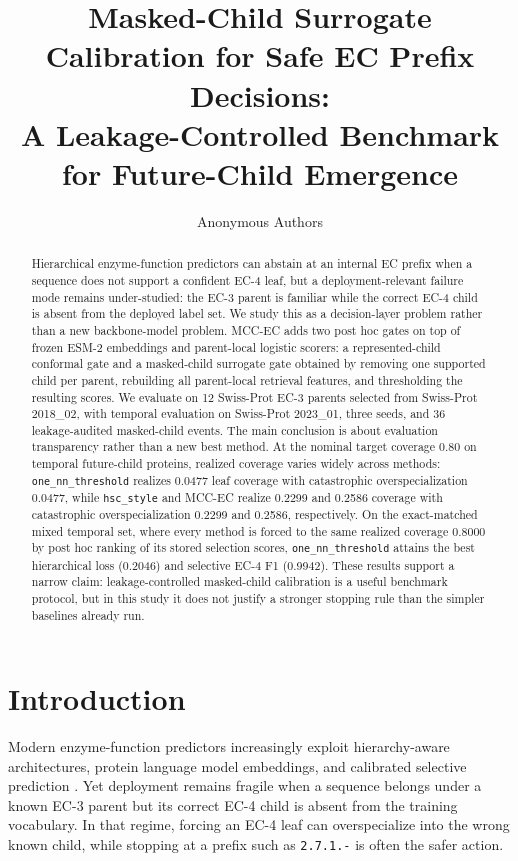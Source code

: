 \documentclass{article}
\title{Masked-Child Surrogate Calibration for Safe EC Prefix Decisions:\\A Leakage-Controlled Benchmark for Future-Child Emergence}
\author{Anonymous Authors}
\newcommand{\method}{MCC-EC\xspace}
\begin{document}
\maketitle

\begin{abstract}
Hierarchical enzyme-function predictors can abstain at an internal EC prefix when a sequence does not support a confident EC-4 leaf, but a deployment-relevant failure mode remains under-studied: the EC-3 parent is familiar while the correct EC-4 child is absent from the deployed label set. We study this as a decision-layer problem rather than a new backbone-model problem. \method adds two post hoc gates on top of frozen ESM-2 embeddings and parent-local logistic scorers: a represented-child conformal gate and a masked-child surrogate gate obtained by removing one supported child per parent, rebuilding all parent-local retrieval features, and thresholding the resulting scores. We evaluate on 12 Swiss-Prot EC-3 parents selected from Swiss-Prot 2018\_02, with temporal evaluation on Swiss-Prot 2023\_01, three seeds, and 36 leakage-audited masked-child events. The main conclusion is about evaluation transparency rather than a new best method. At the nominal target coverage 0.80 on temporal future-child proteins, realized coverage varies widely across methods: \texttt{one\_nn\_threshold} realizes 0.0477 leaf coverage with catastrophic overspecialization 0.0477, while \texttt{hsc\_style} and \method realize 0.2299 and 0.2586 coverage with catastrophic overspecialization 0.2299 and 0.2586, respectively. On the exact-matched mixed temporal set, where every method is forced to the same realized coverage 0.8000 by post hoc ranking of its stored selection scores, \texttt{one\_nn\_threshold} attains the best hierarchical loss (0.2046) and selective EC-4 F1 (0.9942). These results support a narrow claim: leakage-controlled masked-child calibration is a useful benchmark protocol, but in this study it does not justify a stronger stopping rule than the simpler baselines already run.
\end{abstract}

\section{Introduction}

Modern enzyme-function predictors increasingly exploit hierarchy-aware architectures, protein language model embeddings, and calibrated selective prediction \citep{Huang_2024,Yim_2024,Dumontet_2026,Boger_2025}. Yet deployment remains fragile when a sequence belongs under a known EC-3 parent but its correct EC-4 child is absent from the training vocabulary. In that regime, forcing an EC-4 leaf can overspecialize into the wrong known child, while stopping at a prefix such as \texttt{2.7.1.-} is often the safer action.
\end{document}
